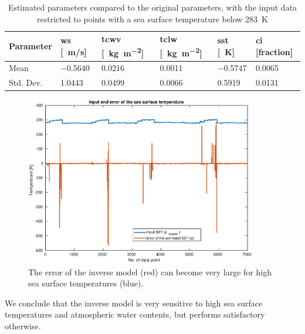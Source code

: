 \documentclass[11pt, a4paper]{article}
\begin{document}
\begin{table}[h]
\centering
\begin{tabular}{@{} l l l l l l @{}}
Parameter & ws [\SI{}{m/s}] & tcwv [\SI{}{\kilo\gram\per\square\meter}] & tclw [\SI{}{\kilo\gram\per\square\meter}] & sst [\SI{}{K}] & ci [fraction] \\
\midrule
Mean & \SI{-0.5640}{} & \SI{0.0216}{} & \SI{0.0011}{} & \SI{-0.5747}{} & \SI{0.0065}{} \\
Std. Dev. & \SI{1.0443}{} & \SI{0.0499}{} & \SI{0.0066}{} & \SI{0.5919}{} & \SI{0.0131}{} \\
\midrule
\end{tabular}
\caption{Estimated parameters compared to the original parameters, with the input data restricted to points with a sea surface temperature below \SI{283}{K}}
\label{tab:errorinvrest}
\end{table}


\begin{figure}[h]
   \centering
   \includegraphics[width=0.9\textwidth]{ValidationInverse_SIC0_sstError.eps}
   \caption{The error of the inverse model (red) can become very large for high sea surface temperatures (blue).}
   \label{fig:sstError}
\end{figure}

We conclude that the inverse model is very sensitive to high sea surface temperatures and atmospheric water contents, but performs satisfactory otherwise.

\clearpage
\end{document}

